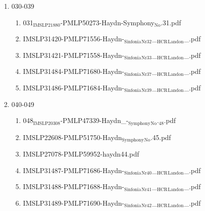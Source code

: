 \documentclass[11pt]{article}
\begin{document}
\begin{enumerate}
\begin{enumerate}
\item 030-039
\label{sec-1-1-1-1-44-38-7-4}
\begin{enumerate}
\item 031$_{\text{IMSLP21880}}$-PMLP50273-Haydn-Symphony$_{\text{No}}$.31.pdf
\label{sec-1-1-1-1-44-38-7-4-1}

\item IMSLP31420-PMLP71556-Haydn-$_{\text{Sinfonia}}$$_{\text{Nr32}}$\_$_{\text{HCR}}$$_{\text{Landon}}$\_.pdf
\label{sec-1-1-1-1-44-38-7-4-2}

\item IMSLP31421-PMLP71558-Haydn-$_{\text{Sinfonia}}$$_{\text{Nr33}}$\_$_{\text{HCR}}$$_{\text{Landon}}$\_.pdf
\label{sec-1-1-1-1-44-38-7-4-3}

\item IMSLP31484-PMLP71680-Haydn-$_{\text{Sinfonia}}$$_{\text{Nr37}}$\_$_{\text{HCR}}$$_{\text{Landon}}$\_.pdf
\label{sec-1-1-1-1-44-38-7-4-4}

\item IMSLP31486-PMLP71684-Haydn-$_{\text{Sinfonia}}$$_{\text{Nr39}}$\_$_{\text{HCR}}$$_{\text{Landon}}$\_.pdf
\label{sec-1-1-1-1-44-38-7-4-5}
\end{enumerate}

\item 040-049
\label{sec-1-1-1-1-44-38-7-5}
\begin{enumerate}
\item 048$_{\text{IMSLP20308}}$-PMLP47339-Haydn\_-$_{\text{Symphony}}$$_{\text{No}}$.$_{\text{48}}$.pdf
\label{sec-1-1-1-1-44-38-7-5-1}

\item IMSLP22608-PMLP51750-Haydn$_{\text{Symphony}}$$_{\text{No}}$.45.pdf
\label{sec-1-1-1-1-44-38-7-5-2}

\item IMSLP27078-PMLP59952-haydn44.pdf
\label{sec-1-1-1-1-44-38-7-5-3}

\item IMSLP31487-PMLP71686-Haydn-$_{\text{Sinfonia}}$$_{\text{Nr40}}$\_$_{\text{HCR}}$$_{\text{Landon}}$\_.pdf
\label{sec-1-1-1-1-44-38-7-5-4}

\item IMSLP31488-PMLP71688-Haydn-$_{\text{Sinfonia}}$$_{\text{Nr41}}$\_$_{\text{HCR}}$$_{\text{Landon}}$\_.pdf
\label{sec-1-1-1-1-44-38-7-5-5}

\item IMSLP31489-PMLP71690-Haydn-$_{\text{Sinfonia}}$$_{\text{Nr42}}$\_$_{\text{HCR}}$$_{\text{Landon}}$\_.pdf
\label{sec-1-1-1-1-44-38-7-5-6}


\end{enumerate}
\end{enumerate}
\end{enumerate}
\end{document}
